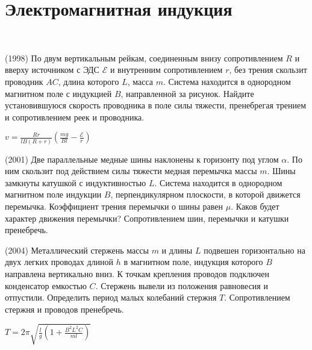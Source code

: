 \section{Электромагнитная индукция}

\begin{ex}
\hspace{0pt} \\
\begin{minipage}{.65\textwidth}
(1998) По двум вертикальным рейкам, соединенным внизу сопротивлением $R$ и вверху источником с ЭДС $\mathcal{E}$ и внутренним сопротивлением $r$, без трения скользит проводник $AC$, длина которого $L$, масса $m$. 
Система находится в однородном магнитном поле с индукцией $B$, направленной за рисунок. 
Найдите установившуюся скорость проводника в поле силы тяжести, пренебрегая трением и сопротивлением реек и проводника.
\end{minipage}
\begin{minipage}{.35\textwidth}
\centering

\end{minipage}
\begin{ans}
$v = \frac{Rr}{lB(R+r)}\left( \frac{mg}{Bl} - \frac{\mathcal{E}}{r} \right)$
\end{ans}
\end{ex}

\begin{ex}
(2001) Две параллельные медные шины наклонены к горизонту под углом  $\alpha$. 
По ним скользит под действием силы тяжести медная перемычка массы $m$. Шины замкнуты катушкой с индуктивностью $L$. 
Система находится в однородном магнитном поле индукции $B$, перпендикулярном плоскости, в которой движется перемычка. 
Коэффициент трения перемычки о шины равен $\mu$. Каков будет характер движения перемычки? Сопротивлением шин, перемычки и катушки пренебречь.
\begin{ans}

\end{ans}
\end{ex}

\begin{ex}
(2004) Металлический стержень массы $m$ и длины $L$ подвешен горизонтально на двух легких проводах длиной $h$ в магнитном поле, 
индукция которого $B$ направлена вертикально вниз. К точкам крепления проводов подключен конденсатор емкостью $C$. 
Стержень вывели из положения равновесия и отпустили. Определить период малых колебаний стержня $T$. Сопротивлением стержня и проводов пренебречь.
\begin{ans}
$T = 2\pi \sqrt{\frac{l}{g} \left( 1 + \frac{B^2L^2C}{ml} \right)}$
\end{ans}
\end{ex}

